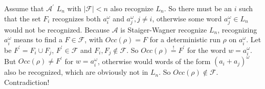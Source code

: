 \documentclass[10pt]{article}
\begin{document}
  Assume that $\mathcal{A}^\prime$ $L_n$ with $\vert
  \mathcal{F}\vert  < n$ also recognize $L_n$. So there must be an $i$ such
  that the set $F_i$ recognizes both $a_i^{\omega}$ and $a_j^{\omega},j\neq i$,
  otherwise some word $a_j^\omega \in L_n$ would not be recognized.
  Because $\mathcal{A}$ is Staiger-Wagner recognize $L_n$, recognizing
  $a_i^\omega$ means to find a $F\in \mathcal{F}$, with $Occ(\rho)=F$ for a
  deterministic run $\rho$ on $a_i^\omega$. Let be $F^\prime =F_i\cup F_j$,
  $F^\prime \in \mathcal{F}$ and $F_i,F_j\not\in \mathcal{F}$. So
  $Occ(\rho)\overset{!}{=}F^\prime$ for the word $w=a_i^\omega$. But
  $Occ(\rho)\neq F^\prime$ for $w=a_i^\omega$, otherwise would words of the form
  $(a_i+a_j)^\omega$ also
  be recognized, which are obviously not in $L_n$. So $Occ(\rho)\not\in
  \mathcal{F}$. Contradiction!
  
  
\end{document}
